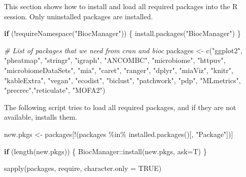 \documentclass[
  oneside]{book}
\newenvironment{Shaded}{\begin{snugshade}}{\end{snugshade}}
\newcommand{\AttributeTok}[1]{\textcolor[rgb]{0.77,0.63,0.00}{#1}}
\newcommand{\CommentTok}[1]{\textcolor[rgb]{0.56,0.35,0.01}{\textit{#1}}}
\newcommand{\ConstantTok}[1]{\textcolor[rgb]{0.00,0.00,0.00}{#1}}
\newcommand{\ControlFlowTok}[1]{\textcolor[rgb]{0.13,0.29,0.53}{\textbf{#1}}}
\newcommand{\FunctionTok}[1]{\textcolor[rgb]{0.00,0.00,0.00}{#1}}
\newcommand{\NormalTok}[1]{#1}
\newcommand{\OtherTok}[1]{\textcolor[rgb]{0.56,0.35,0.01}{#1}}
\newcommand{\SpecialCharTok}[1]{\textcolor[rgb]{0.00,0.00,0.00}{#1}}
\newcommand{\StringTok}[1]{\textcolor[rgb]{0.31,0.60,0.02}{#1}}
\begin{document}
This section shows how to install and load all required packages into
the R session. Only uninstalled packages are installed.

\begin{Shaded}
\begin{Highlighting}[]
\ControlFlowTok{if}\NormalTok{ (}\SpecialCharTok{!}\FunctionTok{requireNamespace}\NormalTok{(}\StringTok{"BiocManager"}\NormalTok{)) \{}
  \FunctionTok{install.packages}\NormalTok{(}\StringTok{"BiocManager"}\NormalTok{)}
\NormalTok{\}}

\CommentTok{\# List of packages that we need from cran and bioc }
\NormalTok{packages }\OtherTok{\textless{}{-}} \FunctionTok{c}\NormalTok{(}\StringTok{"ggplot2"}\NormalTok{, }\StringTok{"pheatmap"}\NormalTok{, }\StringTok{"stringr"}\NormalTok{, }\StringTok{"igraph"}\NormalTok{, }\StringTok{"ANCOMBC"}\NormalTok{,}
             \StringTok{"microbiome"}\NormalTok{, }\StringTok{"httpuv"}\NormalTok{, }\StringTok{"microbiomeDataSets"}\NormalTok{, }\StringTok{"mia"}\NormalTok{, }\StringTok{"caret"}\NormalTok{, }\StringTok{"ranger"}\NormalTok{,}
            \StringTok{"dplyr"}\NormalTok{, }\StringTok{"miaViz"}\NormalTok{, }\StringTok{"knitr"}\NormalTok{, }\StringTok{"kableExtra"}\NormalTok{, }\StringTok{"vegan"}\NormalTok{, }\StringTok{"ecodist"}\NormalTok{, }\StringTok{"biclust"}\NormalTok{,}
            \StringTok{"patchwork"}\NormalTok{, }\StringTok{"pdp"}\NormalTok{, }\StringTok{"MLmetrics"}\NormalTok{, }\StringTok{"precrec"}\NormalTok{,}\StringTok{"reticulate"}\NormalTok{, }\StringTok{"MOFA2"}\NormalTok{)}
\end{Highlighting}
\end{Shaded}

The following script tries to load all required packages, and if they are not available, installs them.

\begin{Shaded}
\begin{Highlighting}[]
\NormalTok{new.pkgs }\OtherTok{\textless{}{-}}\NormalTok{ packages[}\SpecialCharTok{!}\NormalTok{(packages }\SpecialCharTok{\%in\%} \FunctionTok{installed.packages}\NormalTok{()[, }\StringTok{"Package"}\NormalTok{])]}

\ControlFlowTok{if}\NormalTok{ (}\FunctionTok{length}\NormalTok{(new.pkgs)) \{}
\NormalTok{    BiocManager}\SpecialCharTok{::}\FunctionTok{install}\NormalTok{(new.pkgs, }\AttributeTok{ask=}\NormalTok{T)}
\NormalTok{\}}

\FunctionTok{sapply}\NormalTok{(packages, require, }\AttributeTok{character.only =} \ConstantTok{TRUE}\NormalTok{)}
\end{Highlighting}
\end{Shaded}
\end{document}
